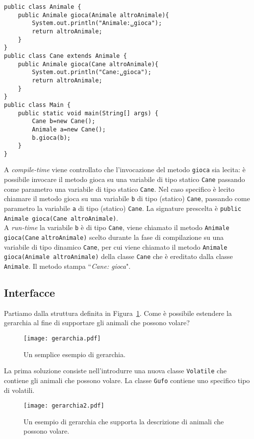 \documentclass{article}
\begin{document}
\begin{lstlisting}
public class Animale {
    public Animale gioca(Animale altroAnimale){
        System.out.println("Animale:␣gioca"); 
        return altroAnimale;
    }
}
public class Cane extends Animale {
    public Animale gioca(Cane altroAnimale){ 
        System.out.println("Cane:␣gioca"); 
        return altroAnimale;
    }
}
public class Main {
    public static void main(String[] args) { 
        Cane b=new Cane();
        Animale a=new Cane();
        b.gioca(b);
    } 
}
\end{lstlisting}
A \emph{compile-time} viene controllato che l'invocazione del metodo \texttt{gioca} sia lecita: \`e possibile invocare il metodo gioca su una variabile di tipo statico \texttt{Cane} passando come parametro una variabile di tipo statico \texttt{Cane}. Nel caso specifico \`e lecito chiamare il metodo gioca su una variabile \texttt{b} di tipo (statico) \texttt{Cane}, passando come parametro la variabile \texttt{a} di tipo (statico) \texttt{Cane}.
La signature prescelta \`e \texttt{public Animale gioca(Cane altroAnimale)}. \\
A \emph{run-time} la variabile \texttt{b} \`e di tipo \texttt{Cane}, viene chiamato il metodo \texttt{Animale gioca(Cane} \texttt{altroAnimale)} scelto durante la fase di compilazione su una variabile di tipo dinamico \texttt{Cane}, per cui viene chiamato il metodo \texttt{Animale gioca(Animale altroAnimale)} della classe \texttt{Cane} che \`e ereditato dalla classe \texttt{Animale}. Il metodo stampa ``\textit{Cane: gioca}".

\subsection{Interfacce}
Partiamo dalla struttura definita in Figura~\ref{Fig:gerarchy2}. Come \`e possibile estendere la gerarchia al fine di supportare gli animali che possono volare?

\begin{figure}[h!]
  \centering
    \texttt{[image: gerarchia.pdf]}
      \caption{Un semplice esempio di gerarchia.}
      \label{Fig:gerarchy2}
\end{figure}

La prima soluzione consiste nell'introdurre una nuova classe \texttt{Volatile} che contiene gli animali che possono volare. La classe \texttt{Gufo} contiene uno specifico tipo di volatili. \\

\begin{figure}[h!]
  \centering
    \texttt{[image: gerarchia2.pdf]}
      \caption{Un esempio di gerarchia che supporta la descrizione di animali che possono volare.}
      \label{Fig:gerarchy3}
\end{figure}
\end{document}

